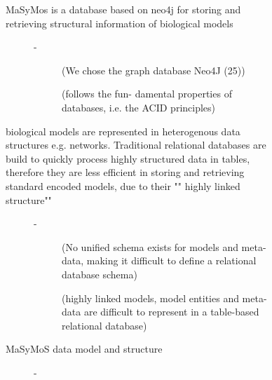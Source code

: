 \begin{description}
\begin{description}
\begin{description}
\begin{description}
\begin{description}
        \end{description} %
        \item[MaSyMos is a database based on neo4j for storing and retrieving structural information of biological models] - 
        \begin{description}
          \item[ \cite{Henkel2015} ] (We chose the graph database Neo4J (25))
          \item[ \cite{Henkel2015} ] (follows the fun- damental properties of databases, i.e. the ACID principles)
        \end{description} %
        \item[biological models are represented in heterogenous data structures e.g. networks. Traditional relational databases are build to quickly process highly structured data in tables, therefore they are less efficient in storing and retrieving standard encoded models, due to their "" highly linked structure""] - 
        \begin{description}
          \item[ \cite{Henkel2015} ] (No unified schema exists for models and meta-data, making it difficult to define a relational database schema)
          \item[ \cite{Henkel2015} ] (highly linked models, model entities and meta-data are difficult to represent in a table-based relational database)
        \end{description} %
        \item[MaSyMoS data model and structure] - 
        \begin{description}

\end{description}
\end{description}
\end{description}
\end{description}
\end{description}
